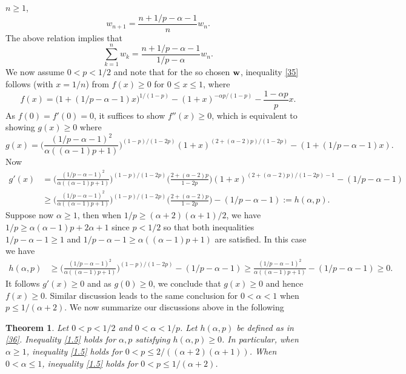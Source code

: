 \documentclass[11pt]{amsart}
\newtheorem{theorem}{Theorem}[section]
\numberwithin{equation}{section}
\theoremstyle{definition}
\theoremstyle{remark}
\begin{document}
   $n \geq 1$,
\begin{equation*}
   w_{n+1}=\frac {n+1/p-\alpha-1}{n}w_n.
\end{equation*}
   The above relation implies that
\begin{equation*}
  \sum^n_{k=1}w_k=\frac {n+1/p-\alpha-1}{1/p-\alpha}w_n.
\end{equation*}
    We now assume $0<p<1/2$ and note that for the so chosen ${\bf w}$, inequality \eqref{35} follows (with
    $x=1/n$) from $f(x) \geq 0$ for $0 \leq x \leq 1$, where
\begin{equation}
\label{3.5'}
  f(x)=\Big(1+(1/p-\alpha-1)x \Big )^{1/(1-p)}-(1+x)^{-\alpha
  p/(1-p)}-\frac {1-\alpha p}{p}x.
\end{equation}
   As $f(0)=f'(0)=0$, it suffices to show $f''(x) \geq 0$, which
   is equivalent to showing $g(x) \geq 0$ where
\begin{equation*}
  g(x)=\Big(\frac {(1/p-\alpha-1)^2}{\alpha ((\alpha-1)p+1)} \Big
  )^{(1-p)/(1-2p)}(1+x)^{(2+(\alpha-2)p)/(1-2p)}-(1+(1/p-\alpha-1)x).
\end{equation*}
   Now
\begin{align}
\label{36}
  g'(x) &=\Big(\frac {(1/p-\alpha-1)^2}{\alpha ((\alpha-1)p+1)} \Big
  )^{(1-p)/(1-2p)}\Big (\frac {2+(\alpha-2)p}{1-2p} \Big
  )(1+x)^{(2+(\alpha-2)p)/(1-2p)-1}-(1/p-\alpha-1)\\
   & \geq \Big(\frac {(1/p-\alpha-1)^2}{\alpha ((\alpha-1)p+1)} \Big
  )^{(1-p)/(1-2p)}\Big (\frac {2+(\alpha-2)p}{1-2p} \Big
  )-(1/p-\alpha-1):=h(\alpha, p). \nonumber
\end{align}
   Suppose now $\alpha \geq 1$, then when $1/p \geq (\alpha+2)(\alpha+1)/2$, we have $1/p \geq \alpha(\alpha-1)p+2\alpha+1$ since $p < 1/2$ so that
   both inequalities $1/p-\alpha-1 \geq 1$ and $1/p-\alpha-1 \geq \alpha
   ((\alpha-1)p+1)$ are satisfied. In this case we have
\begin{align*}
   h(\alpha, p) & \geq \Big(\frac {(1/p-\alpha-1)^2}{\alpha ((\alpha-1)p+1)} \Big
  )^{(1-p)/(1-2p)}-(1/p-\alpha-1) \geq  \frac {(1/p-\alpha-1)^2}{\alpha ((\alpha-1)p+1)} -(1/p-\alpha-1) \geq 0.
\end{align*}
   It follows $g'(x) \geq 0$ and as $g(0) \geq 0$, we conclude that $g(x) \geq 0$ and hence $f(x) \geq
   0$. Similar discussion leads to the same conclusion for $0< \alpha< 1$ when $p \leq 1/(\alpha+2)$. We now summarize our discussions above in the following
\begin{theorem}
   Let $0<p<1/2$ and $0 < \alpha < 1/p$. Let $h(\alpha, p)$ be defined
   as in \eqref{36}. Inequality \eqref{1.5} holds for $\alpha, p$ satisfying $h(\alpha, p) \geq 0$. In
   particular, when $\alpha \geq 1$,
   inequality \eqref{1.5} holds for $0<p \leq 2/((\alpha+2)(\alpha+1))$. When $0< \alpha \leq 1$,
   inequality \eqref{1.5} holds for $0<p \leq 1/(\alpha+2)$.
\end{theorem}
\end{document}
